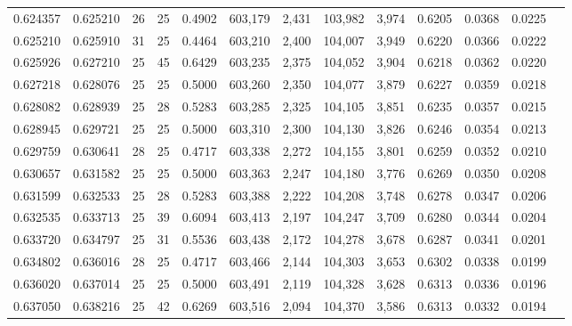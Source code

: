 \begin{tabular}{rrrrrrrrrrrrr}
0.624357 & 0.625210 &    26 &  25 &                                     0.4902 & 603,179 &   2,431 & 103,982 &   3,974 & 0.6205 & 0.0368 & 0.0225 \\
0.625210 & 0.625910 &    31 &  25 &                                     0.4464 & 603,210 &   2,400 & 104,007 &   3,949 & 0.6220 & 0.0366 & 0.0222 \\
0.625926 & 0.627210 &    25 &  45 &                                     0.6429 & 603,235 &   2,375 & 104,052 &   3,904 & 0.6218 & 0.0362 & 0.0220 \\
0.627218 & 0.628076 &    25 &  25 &                                     0.5000 & 603,260 &   2,350 & 104,077 &   3,879 & 0.6227 & 0.0359 & 0.0218 \\
0.628082 & 0.628939 &    25 &  28 &                                     0.5283 & 603,285 &   2,325 & 104,105 &   3,851 & 0.6235 & 0.0357 & 0.0215 \\
0.628945 & 0.629721 &    25 &  25 &                                     0.5000 & 603,310 &   2,300 & 104,130 &   3,826 & 0.6246 & 0.0354 & 0.0213 \\
0.629759 & 0.630641 &    28 &  25 &                                     0.4717 & 603,338 &   2,272 & 104,155 &   3,801 & 0.6259 & 0.0352 & 0.0210 \\
0.630657 & 0.631582 &    25 &  25 &                                     0.5000 & 603,363 &   2,247 & 104,180 &   3,776 & 0.6269 & 0.0350 & 0.0208 \\
0.631599 & 0.632533 &    25 &  28 &                                     0.5283 & 603,388 &   2,222 & 104,208 &   3,748 & 0.6278 & 0.0347 & 0.0206 \\
0.632535 & 0.633713 &    25 &  39 &                                     0.6094 & 603,413 &   2,197 & 104,247 &   3,709 & 0.6280 & 0.0344 & 0.0204 \\
0.633720 & 0.634797 &    25 &  31 &                                     0.5536 & 603,438 &   2,172 & 104,278 &   3,678 & 0.6287 & 0.0341 & 0.0201 \\
0.634802 & 0.636016 &    28 &  25 &                                     0.4717 & 603,466 &   2,144 & 104,303 &   3,653 & 0.6302 & 0.0338 & 0.0199 \\
0.636020 & 0.637014 &    25 &  25 &                                     0.5000 & 603,491 &   2,119 & 104,328 &   3,628 & 0.6313 & 0.0336 & 0.0196 \\
0.637050 & 0.638216 &    25 &  42 &                                     0.6269 & 603,516 &   2,094 & 104,370 &   3,586 & 0.6313 & 0.0332 & 0.0194 \\

\end{tabular}
